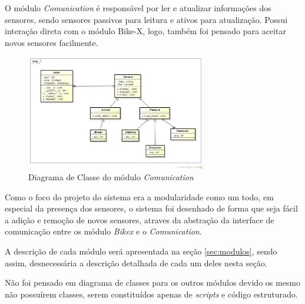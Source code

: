 O módulo \textit{Comunication} é responsável por ler e atualizar informações dos sensores, sendo sensores passivos para leitura e ativos para atualização. Possui interação direta com o módulo Bike-X, logo, também foi pensado para aceitar novos sensores facilmente.

\begin{figure}[h]
  \centering
	\includegraphics[width=0.7\textwidth]{figuras/Comunication}
	\caption{Diagrama de Classe do módulo \textit{Comunication}}
  \label{fig:diagrama-classe-comunication}
\end{figure}

Como o foco do projeto do sistema era a modularidade como um todo, em especial da presença dos sensores, o sistema foi desenhado de forma que seja fácil a adição e remoção de novos sensores, atraves da abstração da interface de comunicação entre os módulo \textit{Bikex} e o \textit{Comunication}.

A descrição de cada módulo será apresentada na seção \ref{sec:modulos}, sendo assim, desnecessária a descrição detalhada de cada um deles nesta seção.

Não foi pensado em diagrama de classes para os outros módulos devido os mesmo não possuírem classes, serem constituídos apenas de \textit{scripts} e código estruturado.


